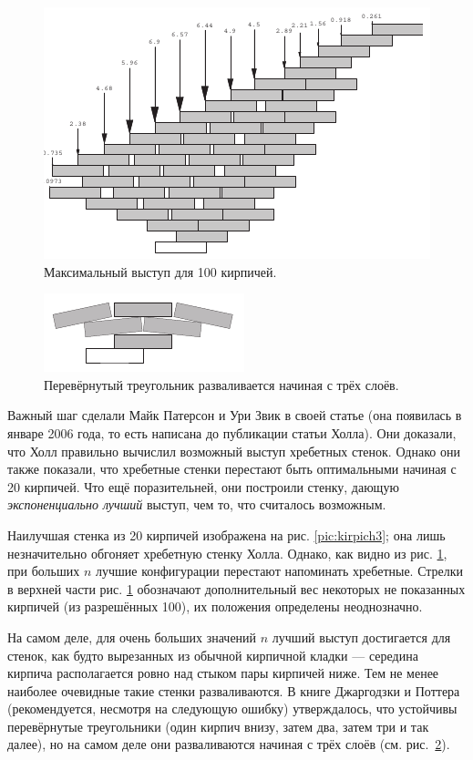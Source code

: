 \begin{figure}[htb!]
\centering
\includegraphics[scale=1]{pics/kirpich4}
\caption{Максимальный выступ для 100 кирпичей.}
\label{pic:kirpich4}
\end{figure}

\begin{figure}[htb!]
\centering
\includegraphics[scale=1]{pics/kirpich5}
\caption{Перевёрнутый треугольник разваливается начиная с трёх слоёв.}
\label{pic:kirpich5}
\end{figure}

Важный шаг сделали Майк Патерсон и Ури Звик в своей статье \cite{47} (она появилась в январе 2006 года, то есть написана до публикации статьи Холла).
Они доказали, что Холл правильно вычислил возможный выступ хребетных стенок.
Однако они также показали, что хребетные стенки перестают быть оптимальными начиная с 20 кирпичей.
Что ещё поразительней, они построили стенку, дающую \emph{экспоненциально лучший} выступ, чем то, что считалось возможным.

Наилучшая стенка из 20 кирпичей изображена на рис. \ref{pic:kirpich3};
она лишь незначительно обгоняет хребетную стенку Холла.
Однако, как видно из рис. \ref{pic:kirpich4},  при больших $n$ лучшие конфигурации перестают напоминать хребетные.
Стрелки в верхней части рис. \ref{pic:kirpich4} обозначают дополнительный вес некоторых не показанных кирпичей (из разрешённых 100), их положения определены неоднозначно.

На самом деле, для очень больших значений $n$ лучший выступ достигается для стенок, как будто вырезанных из обычной кирпичной кладки --- середина кирпича располагается ровно над стыком пары кирпичей ниже.
Тем не менее наиболее очевидные такие стенки разваливаются.
В книге Джаргодзки и Поттера \cite{38} (рекомендуется, несмотря на следующую ошибку) утверждалось, что устойчивы перевёрнутые треугольники (один кирпич внизу, затем два, затем три и так далее), но на самом деле они разваливаются начиная с трёх слоёв (см. рис.~\ref{pic:kirpich5}).  

